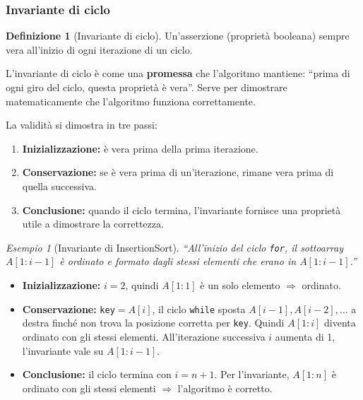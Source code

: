 \documentclass[a4paper, 11pt]{article}
\theoremstyle{definition}
\newtheorem{definizione}{Definizione}[section]
\theoremstyle{remark}
\newtheorem{esempio}{Esempio}[section]
\theoremstyle{remark}
\newenvironment{nota}{%
	\begin{tcolorbox}[
		colback=codebg,
		colframe=primary,
		fonttitle=\bfseries,
		title=Nota,
		left=6pt, right=6pt, top=4pt, bottom=4pt
		]
	}{%
	\end{tcolorbox}
}
\begin{document}
	\pagebreak
	\subsubsection*{Invariante di ciclo}
	
	\begin{definizione}[Invariante di ciclo]
		Un'asserzione (proprietà booleana) sempre vera all'inizio
		di ogni iterazione di un ciclo.
	\end{definizione}
	
	\begin{nota}
		L'invariante di ciclo è come una \textbf{promessa} che l'algoritmo mantiene: ``prima di ogni giro del ciclo, questa proprietà è vera''. Serve per dimostrare matematicamente che l'algoritmo funziona correttamente.
	\end{nota}
	
	La validità si dimostra in tre passi:
	\begin{enumerate}
		\item \textbf{Inizializzazione:} è vera prima della prima iterazione.
		\item \textbf{Conservazione:} se è vera prima di un'iterazione,
		rimane vera prima di quella successiva.
		\item \textbf{Conclusione:} quando il ciclo termina, l'invariante
		fornisce una proprietà utile a dimostrare la correttezza.
	\end{enumerate}
	
	\begin{esempio}[Invariante di InsertionSort]
		\textit{``All'inizio del ciclo \texttt{for}, il sottoarray
			$A[1:i-1]$ è ordinato e formato dagli stessi elementi
			che erano in $A[1:i-1]$.''}
		
		\begin{itemize}
			\item \textbf{Inizializzazione:} $i=2$, quindi $A[1:1]$
			è un solo elemento $\Rightarrow$ ordinato. \checkmark
			\item \textbf{Conservazione:} \texttt{key}$= A[i]$,
			il ciclo \texttt{while} sposta $A[i-1], A[i-2],\ldots$
			a destra finché non trova la posizione corretta per
			\texttt{key}. Quindi $A[1:i]$ diventa ordinato con
			gli stessi elementi. All'iterazione successiva
			$i$ aumenta di 1, l'invariante vale su $A[1:i-1]$.
			\checkmark
			\item \textbf{Conclusione:} il ciclo termina con $i = n+1$.
			Per l'invariante, $A[1:n]$ è ordinato con gli stessi
			elementi $\Rightarrow$ l'algoritmo è corretto. \checkmark
		\end{itemize}
	\end{esempio}
	
\end{document}
